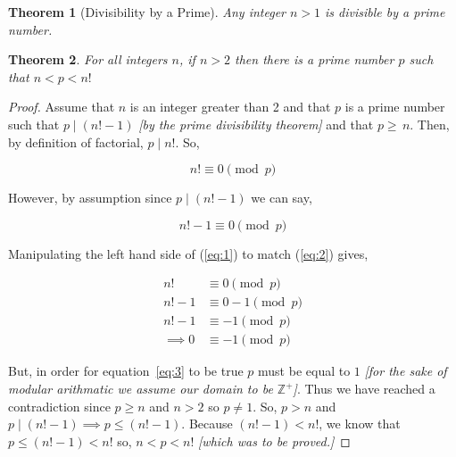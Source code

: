 \documentclass{article}
\newtheorem{theorem}{Theorem}
\begin{document}
\begin{theorem}[Divisibility by a Prime]
Any integer $n>1$ is divisible by a prime number.
\end{theorem}

\begin{theorem}
For all integers $n$, if $n>2$ then there is a prime number $p$ such that $n<p<n\textbf{!}$
\end{theorem}

\begin{proof}
  Assume that $n$ is an integer greater than 2 and that $p$ is a prime number such that $p \mid \left(n\textbf{!} - 1\right)$ \textit{[by the prime divisibility theorem]} and that $p\geq\,n$. Then, by definition of factorial, $p \mid n\textbf{!}$. So, 

  \begin{equation}
    n\textbf{!} \equiv 0 \pmod{p}
  \label{eq:1}
  \end{equation}

  However, by assumption since $p \mid \left(n\textbf{!}-1\right)$ we can say,

  \begin{equation}
    n\textbf{!} - 1 \equiv 0 \pmod{p}
  \label{eq:2}
  \end{equation}

  Manipulating the left hand side of (\ref{eq:1}) to match (\ref{eq:2}) gives,

  \begin{align}
    n\textbf{!} &\equiv 0 \pmod{p} \nonumber \\ 
    n\textbf{!} - 1 &\equiv 0 - 1 \pmod{p} \nonumber \\ 
    n\textbf{!} - 1 &\equiv -1 \pmod{p} \nonumber \\ 
    \implies 0 &\equiv -1 \pmod{p} \label{eq:3}
  \end{align}

  But, in order for equation~\ref{eq:3} to be true $p$ must be equal to $1$ \textit{[for the sake of modular arithmatic we assume our domain to be $\mathbb{Z}^{+}$]}. Thus we have reached a contradiction since $p \geq n$ and $n > 2$ so $p \ne 1$. So, $p > n$ and \\ $p \mid \left(n\textbf{!}-1\right) \implies p \leq \left(n\textbf{!}-1\right)$. Because $\left(n\textbf{!}-1\right) < n\textbf{!}$, we know that \\ $p \leq \left(n\textbf{!}-1\right) < n\textbf{!}$ so, $n < p < n\textbf{!}$ \textit{[which was to be proved.]}
\end{proof}
\end{document}
